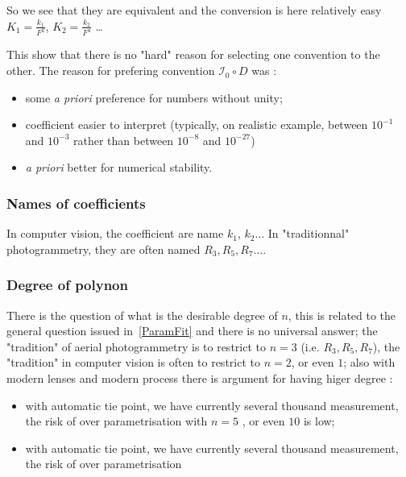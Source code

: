 So we see that they are equivalent and the conversion is here relatively easy  $K_1 = \frac{k_1}{F^2} $,
$K_2 = \frac{k_2}{F^4} $ \dots

This show  that there is no "hard" reason for selecting one convention to the other. The reason for
prefering convention  $\mathcal{I}_0  \circ D$ was :

\begin{itemize}
    \item some \emph{a priori} preference for numbers without unity;

    \item coefficient easier to interpret (typically, on realistic example, between $10^{-1}$ and $10^{-3}$ rather than between $10^{-8}$ and  $10^{-27}$)

    \item \emph{a priori} better for numerical stability.
\end{itemize}


\subsubsection{Names of coefficients}

In computer vision, the coefficient are name $k_1$, $k_2 \dots$ 
In  "traditionnal" photogrammetry, they are often named $R_3,R_5,R_7\dots$.


\subsubsection{Degree of polynon}

There is the question of what is the desirable degree of $n$, this is related to the general question issued in~\ref{ParamFit}
and there is no universal answer;  the "tradition" of aerial photogrammetry is to restrict to $n=3$  (i.e. $R_3,R_5,R_7$),
the "tradition" in computer vision is often to restrict to $n=2$, or even $1$;  also with modern lenses and modern
process there is argument for having higer degree  :
           
\begin{itemize}
         \item   with automatic tie point, we have currently several thousand measurement, the risk of over parametrisation
                 with $n=5$ , or even $10$ is low;

         \item   with automatic tie point, we have currently several thousand measurement, the risk of over parametrisation
\end{itemize}

